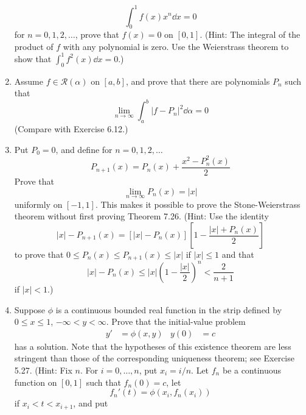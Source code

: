 \documentclass[../psets.tex]{subfiles}
\begin{document}
\begin{enumerate}[label={\textbf{\arabic*.}}]
\begin{equation*}
        \int_0^1f(x)x^n\dd{x} = 0
    \end{equation*}
    for $n=0,1,2,\dots$, prove that $f(x)=0$ on $[0,1]$. (Hint: The integral of the product of $f$ with any polynomial is zero. Use the Weierstrass theorem to show that $\int_0^1f^2(x)\dd{x}=0$.)
    \item Assume $f\in\mathscr{R}(\alpha)$ on $[a,b]$, and prove that there are polynomials $P_n$ such that
    \begin{equation*}
        \lim_{n\to\infty}\int_a^b|f-P_n|^2\dd{\alpha} = 0
    \end{equation*}
    (Compare with Exercise 6.12.)
    \item Put $P_0=0$, and define for $n=0,1,2,\dots$
    \begin{equation*}
        P_{n+1}(x) = P_n(x)+\frac{x^2-P_n^2(x)}{2}
    \end{equation*}
    Prove that
    \begin{equation*}
        \lim_{n\to\infty}P_n(x) = |x|
    \end{equation*}
    uniformly on $[-1,1]$. This makes it possible to prove the Stone-Weierstrass theorem without first proving Theorem 7.26. (Hint: Use the identity
    \begin{equation*}
        |x|-P_{n+1}(x) = [|x|-P_n(x)]\left[ 1-\frac{|x|+P_n(x)}{2} \right]
    \end{equation*}
    to prove that $0\leq P_n(x)\leq P_{n+1}(x)\leq|x|$ if $|x|\leq 1$ and that
    \begin{equation*}
        |x|-P_n(x) \leq |x|\left( 1-\frac{|x|}{2} \right)^n < \frac{2}{n+1}
    \end{equation*}
    if $|x|<1$.)
    \item Suppose $\phi$ is a continuous bounded real function in the strip defined by $0\leq x\leq 1$, $-\infty <y<\infty$. Prove that the initial-value problem
    \begin{align*}
        y' &= \phi(x,y)&
        y(0) &= c
    \end{align*}
    has a solution. Note that the hypotheses of this existence theorem are less stringent than those of the corresponding uniqueness theorem; see Exercise 5.27. (Hint: Fix $n$. For $i=0,\dots,n$, put $x_i=i/n$. Let $f_n$ be a continuous function on $[0,1]$ such that $f_n(0)=c$, let
    \begin{equation*}
        f_n'(t) = \phi(x_i,f_n(x_i))
    \end{equation*}
    if $x_i<t<x_{i+1}$, and put

\end{enumerate}
\end{document}
